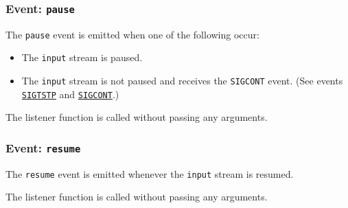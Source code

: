 \subsubsection{\texorpdfstring{Event:
\texttt{\textquotesingle{}pause\textquotesingle{}}}{Event: \textquotesingle pause\textquotesingle{}}}\label{event-pause}

The \texttt{\textquotesingle{}pause\textquotesingle{}} event is emitted
when one of the following occur:

\begin{itemize}
\tightlist
\item
  The \texttt{input} stream is paused.
\item
  The \texttt{input} stream is not paused and receives the
  \texttt{\textquotesingle{}SIGCONT\textquotesingle{}} event. (See
  events
  \hyperref[event-sigtstp]{\texttt{\textquotesingle{}SIGTSTP\textquotesingle{}}}
  and
  \hyperref[event-sigcont]{\texttt{\textquotesingle{}SIGCONT\textquotesingle{}}}.)
\end{itemize}

The listener function is called without passing any arguments.

\begin{Shaded}
\begin{Highlighting}[]
\NormalTok{(}\OperatorTok{,}\NormalTok{ () }\KeywordTok{=\textgreater{}}\NormalTok{ \{}
  \NormalTok{(}\NormalTok{)}\OperatorTok{;}
\NormalTok{\})}\OperatorTok{;}
\end{Highlighting}
\end{Shaded}

\subsubsection{\texorpdfstring{Event:
\texttt{\textquotesingle{}resume\textquotesingle{}}}{Event: \textquotesingle resume\textquotesingle{}}}\label{event-resume}

The \texttt{\textquotesingle{}resume\textquotesingle{}} event is emitted
whenever the \texttt{input} stream is resumed.

The listener function is called without passing any arguments.

\begin{Shaded}
\begin{Highlighting}[]
\NormalTok{(}\OperatorTok{,}\NormalTok{ () }\KeywordTok{=\textgreater{}}\NormalTok{ \{}
  \NormalTok{(}\NormalTok{)}\OperatorTok{;}
\NormalTok{\})}\OperatorTok{;}
\end{Highlighting}
\end{Shaded}

